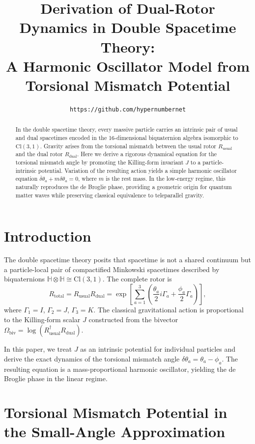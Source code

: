 \documentclass[dvipdfmx,11pt,a4paper]{article}
\title{Derivation of Dual-Rotor Dynamics in Double Spacetime Theory:\\ 
A Harmonic Oscillator Model from Torsional Mismatch Potential}
\author{\texttt{https://github.com/hypernumbernet}}
\date{}
\begin{document}
\maketitle

\begin{abstract}
In the double spacetime theory, every massive particle carries an intrinsic pair of usual and dual spacetimes encoded in the 16-dimensional biquaternion algebra isomorphic to $\mathrm{Cl}(3,1)$. Gravity arises from the torsional mismatch between the usual rotor $R_{\text{usual}}$ and the dual rotor $R_{\text{dual}}$. Here we derive a rigorous dynamical equation for the torsional mismatch angle by promoting the Killing-form invariant $J$ to a particle-intrinsic potential. Variation of the resulting action yields a simple harmonic oscillator equation $\ddot{\delta\theta}_a + m \delta\theta_a = 0$, where $m$ is the rest mass. In the low-energy regime, this naturally reproduces the de Broglie phase, providing a geometric origin for quantum matter waves while preserving classical equivalence to teleparallel gravity.
\end{abstract}

\section{Introduction}

The double spacetime theory posits that spacetime is not a shared continuum but a particle-local pair of compactified Minkowski spacetimes described by biquaternions $\mathbb{H}\otimes\mathbb{H}\cong\mathrm{Cl}(3,1)$. The complete rotor is
\[
R_{\text{total}} = R_{\text{usual}} R_{\text{dual}}
= \exp\!\left[\sum_{a=1}^3 \left(\frac{\theta_a}{2} i\Gamma_a + \frac{\phi_a}{2}\Gamma_a\right)\right],
\]
where $\Gamma_1=I$, $\Gamma_2=J$, $\Gamma_3=K$. The classical gravitational action is proportional to the Killing-form scalar $J$ constructed from the bivector $\Omega_{\text{biv}} = \log(R_{\text{usual}}^\dagger R_{\text{dual}})$.

In this paper, we treat $J$ as an intrinsic potential for individual particles and derive the exact dynamics of the torsional mismatch angle $\delta\theta_a = \theta_a - \phi_a$. The resulting equation is a mass-proportional harmonic oscillator, yielding the de Broglie phase in the linear regime.

\section{Torsional Mismatch Potential in the Small-Angle Approximation}
\end{document}
